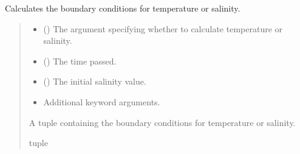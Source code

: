 \documentclass[a4paper,11pt,english,openany]{sphinxmanual}
\begin{document}
\begin{fulllineitems}
\label{\detokenize{api/spyice.preprocess.initial_boundary_conditions:spyice.preprocess.initial_boundary_conditions.boundary_condition}}
\pysigstartsignatures
{}
\pysigstopsignatures
\sphinxAtStartPar
Calculates the boundary conditions for temperature or salinity.
\begin{quote}\begin{description}
\begin{itemize}
\item {} 
\sphinxAtStartPar
{} () \textendash{} The argument specifying whether to calculate temperature or salinity.

\item {} 
\sphinxAtStartPar
{} () \textendash{} The time passed.

\item {} 
\sphinxAtStartPar
{} () \textendash{} The initial salinity value.

\item {} 
\sphinxAtStartPar
{} \textendash{} Additional keyword arguments.

\end{itemize}

\sphinxAtStartPar
A tuple containing the boundary conditions for temperature or salinity.

\sphinxAtStartPar
tuple

\sphinxAtStartPar
{} \textendash{} 

\end{description}\end{quote}

\end{fulllineitems}
\end{document}
